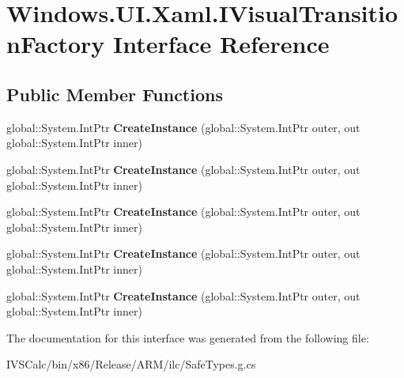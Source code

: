 \hypertarget{interface_windows_1_1_u_i_1_1_xaml_1_1_i_visual_transition_factory}{}\section{Windows.\+U\+I.\+Xaml.\+I\+Visual\+Transition\+Factory Interface Reference}
\label{interface_windows_1_1_u_i_1_1_xaml_1_1_i_visual_transition_factory}
\subsection*{Public Member Functions}
\begin{DoxyCompactItemize}
\item 
\mbox{\label{interface_windows_1_1_u_i_1_1_xaml_1_1_i_visual_transition_factory_ad811958dbcded5608b5b193e51d56640}} 
global\+::\+System.\+Int\+Ptr {\bfseries Create\+Instance} (global\+::\+System.\+Int\+Ptr outer, out global\+::\+System.\+Int\+Ptr inner)
\item 
\mbox{\label{interface_windows_1_1_u_i_1_1_xaml_1_1_i_visual_transition_factory_ad811958dbcded5608b5b193e51d56640}} 
global\+::\+System.\+Int\+Ptr {\bfseries Create\+Instance} (global\+::\+System.\+Int\+Ptr outer, out global\+::\+System.\+Int\+Ptr inner)
\item 
\mbox{\label{interface_windows_1_1_u_i_1_1_xaml_1_1_i_visual_transition_factory_ad811958dbcded5608b5b193e51d56640}} 
global\+::\+System.\+Int\+Ptr {\bfseries Create\+Instance} (global\+::\+System.\+Int\+Ptr outer, out global\+::\+System.\+Int\+Ptr inner)
\item 
\mbox{\label{interface_windows_1_1_u_i_1_1_xaml_1_1_i_visual_transition_factory_ad811958dbcded5608b5b193e51d56640}} 
global\+::\+System.\+Int\+Ptr {\bfseries Create\+Instance} (global\+::\+System.\+Int\+Ptr outer, out global\+::\+System.\+Int\+Ptr inner)
\item 
\mbox{\label{interface_windows_1_1_u_i_1_1_xaml_1_1_i_visual_transition_factory_ad811958dbcded5608b5b193e51d56640}} 
global\+::\+System.\+Int\+Ptr {\bfseries Create\+Instance} (global\+::\+System.\+Int\+Ptr outer, out global\+::\+System.\+Int\+Ptr inner)
\end{DoxyCompactItemize}


The documentation for this interface was generated from the following file\+:\begin{DoxyCompactItemize}
\item 
I\+V\+S\+Calc/bin/x86/\+Release/\+A\+R\+M/ilc/Safe\+Types.\+g.\+cs\end{DoxyCompactItemize}
